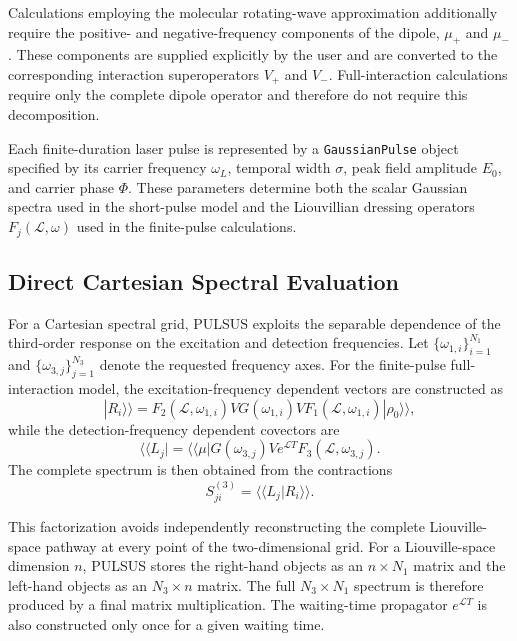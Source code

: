 Calculations employing the molecular rotating-wave approximation
additionally require the positive- and negative-frequency components
of the dipole, $\mu_{+}$ and $\mu_{-}$.
These components are supplied explicitly by the user and are converted
to the corresponding interaction superoperators $V_{+}$ and $V_{-}$.
Full-interaction calculations require only the complete dipole
operator and therefore do not require this decomposition.

Each finite-duration laser pulse is represented by a
\texttt{GaussianPulse} object specified by its carrier frequency
$\omega_L$, temporal width $\sigma$, peak field amplitude $E_0$, and
carrier phase $\Phi$.
These parameters determine both the scalar Gaussian spectra used in
the short-pulse model and the Liouvillian dressing operators
$F_j(\mathcal{L},\omega)$ used in the finite-pulse calculations.

\subsection{Direct Cartesian Spectral Evaluation}
\label{sec:software_cartesian}

For a Cartesian spectral grid, PULSUS exploits the separable dependence
of the third-order response on the excitation and detection frequencies.
Let $\{\omega_{1,i}\}_{i=1}^{N_1}$ and
$\{\omega_{3,j}\}_{j=1}^{N_3}$ denote the requested frequency axes.
For the finite-pulse full-interaction model, the excitation-frequency
dependent vectors are constructed as
%
\begin{equation}
|R_i\rangle\rangle
=
F_2(\mathcal{L},\omega_{1,i})
V
G(\omega_{1,i})
V
F_1(\mathcal{L},\omega_{1,i})
|\rho_0\rangle\rangle ,
\label{eq:software_right}
\end{equation}
%
while the detection-frequency dependent covectors are
%
\begin{equation}
\langle\langle L_j|
=
\langle\langle\mu|
G(\omega_{3,j})
V
e^{\mathcal{L}T}
F_3(\mathcal{L},\omega_{3,j}) .
\label{eq:software_left}
\end{equation}
%
The complete spectrum is then obtained from the contractions
%
\begin{equation}
S_{ji}^{(3)}
=
\langle\langle L_j|R_i\rangle\rangle .
\label{eq:software_factorization}
\end{equation}

This factorization avoids independently reconstructing the complete
Liouville-space pathway at every point of the two-dimensional grid.
For a Liouville-space dimension $n$, PULSUS stores the right-hand
objects as an $n\times N_1$ matrix and the left-hand objects as an
$N_3\times n$ matrix.
The full $N_3\times N_1$ spectrum is therefore produced by a final
matrix multiplication.
The waiting-time propagator $e^{\mathcal{L}T}$ is also constructed only
once for a given waiting time.

